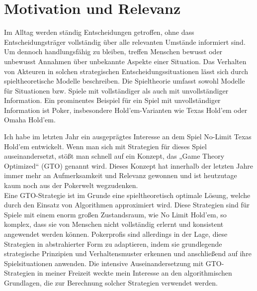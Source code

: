 \section{Motivation und Relevanz}

Im Alltag werden ständig Entscheidungen getroffen, ohne dass Entscheidungsträger vollständig über alle relevanten Umstände informiert sind.
Um dennoch handlungsfähig zu bleiben, treffen Menschen bewusst oder unbewusst Annahmen über unbekannte Aspekte einer Situation.
Das Verhalten von Akteuren in solchen strategischen Entscheidungssituationen lässt sich durch spieltheoretische Modelle beschreiben.
Die Spieltheorie umfasst sowohl Modelle für Situationen bzw. Spiele mit vollständiger als auch mit unvollständiger Information.
Ein prominentes Beispiel für ein Spiel mit unvollständiger Information ist Poker, insbesondere Hold'em-Varianten wie Texas Hold'em oder Omaha Hold'em.

Ich habe im letzten Jahr ein ausgeprägtes Interesse an dem Spiel No-Limit Texas Hold'em entwickelt. 
Wenn man sich mit Strategien für dieses Spiel auseinandersetzt, stößt man schnell auf ein Konzept, das „Game Theory Optimized“ (GTO) genannt wird.
Dieses Konzept hat innerhalb der letzten Jahre immer mehr an Aufmerksamkeit und Relevanz gewonnen und ist heutzutage kaum noch aus der Pokerwelt wegzudenken.\\
Eine GTO-Strategie ist im Grunde eine spieltheoretisch optimale Lösung, welche durch den Einsatz von Algorithmen approximiert wird. 
Diese Strategien sind für Spiele mit einem enorm großen Zustandsraum, wie No Limit Hold'em, so komplex, dass sie von Menschen nicht vollständig erlernt und konsistent angewendet werden können.
Pokerprofis sind allerdings in der Lage, diese Strategien in abstrahierter Form zu adaptieren, indem sie grundlegende strategische Prinzipien und Verhaltensmuster erkennen und anschließend auf ihre Spielsituationen anwenden.
Die intensive Auseinandersetzung mit GTO-Strategien in meiner Freizeit weckte mein Interesse an den algorithmischen Grundlagen, die zur Berechnung solcher Strategien verwendet werden.

